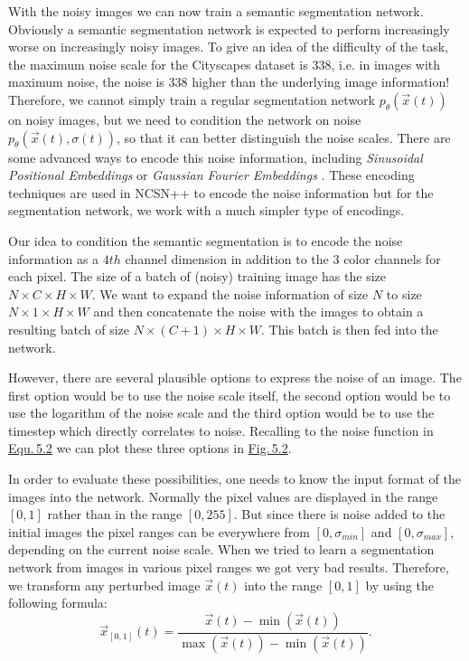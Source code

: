 With the noisy images we can now train a semantic segmentation network. Obviously a semantic segmentation network is expected to perform increasingly worse on increasingly noisy images. To give an idea of the difficulty of the task, the maximum noise scale for the Cityscapes dataset is $338$, i.e. in images with maximum noise, the noise is $338$ higher than the underlying image information! Therefore, we cannot simply train a regular segmentation network $p_\theta(\vec{x}(t))$ on noisy images, but we need to condition the network on noise $p_\theta(\vec{x}(t), \sigma(t))$, so that it can better distinguish the noise scales. There are some advanced ways to encode this noise information, including \textit{Sinusoidal Positional Embeddings} \cite{attention} or \textit{Gaussian Fourier Embeddings} \cite{fourfeat}. These encoding techniques are used in NCSN++ to encode the noise information but for the segmentation network, we work with a much simpler type of encodings.

Our idea to condition the semantic segmentation is to encode the noise information as a $4th$ channel dimension in addition to the $3$ color channels for each pixel. The size of a batch of (noisy) training image has the size $N\times C\times H\times W$. We want to expand the noise information of size $N$ to size $N\times 1\times H\times W$ and then concatenate the noise with the images to obtain a resulting batch of size $N\times (C+1)\times H\times W$. This batch is then fed into the network.

However, there are several plausible options to express the noise of an image. The first option would be to use the noise scale itself, the second option would be to use the logarithm of the noise scale and the third option would be to use the timestep which directly correlates to noise. Recalling to the noise function in \hyperref[equ:5.2]{Equ.\,5.2} we can plot these three options in \hyperref[fig:5.2]{Fig.\,5.2}.

In order to evaluate these possibilities, one needs to know the input format of the images into the network. Normally the pixel values are displayed in the range $[0, 1]$ rather than in the range $[0, 255]$. But since there is noise added to the initial images the pixel ranges can be everywhere from $[0,\sigma_{min}]$ and $[0, \sigma_{max}]$, depending on the current noise scale. When we tried to learn a segmentation network from images in various pixel ranges we got very bad results. Therefore, we transform any perturbed image $\vec{x}(t)$ into the range $[0, 1]$ by using the following formula:
%
\begin{equation}
    \vec{x}_{[0,1]}(t)=\frac{\vec{x}(t)-\min(\vec{x}(t))}{\max(\vec{x}(t))-\min(\vec{x}(t))}.
\end{equation}
%

